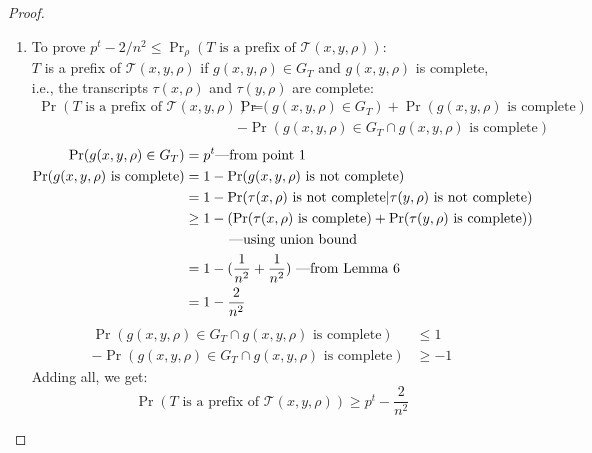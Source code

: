 \documentclass{article}
\begin{document}
\begin{proof}
\begin{enumerate}
        \item To prove $p^t-2/n^2 \leq \Pr_\rho(T\text{ is a prefix of }\mathcal{T}(x,y,\rho))$:\\
    $T$ is a prefix of $\mathcal{T}(x,y,\rho)$ if $g(x,y,\rho)\in G_T$ and $g(x,y,\rho)$
    is complete, i.e., the transcripts $\tau(x,\rho)$ and $\tau(y,\rho)$ are complete:
    \begin{align}
        \Pr(T\text{ is a prefix of }\mathcal{T}(x,y,\rho))=&\Pr(g(x,y,\rho)\in G_T)
    +\Pr(g(x,y,\rho)\text{ is complete}) \nonumber\\
    &-\Pr(g(x,y,\rho)\in G_T \cap g(x,y,\rho)\text{ is complete})\nonumber
    \end{align}
    \begin{align}
        \Pr(g(x,y,\rho)\in G_T)&=p^t\text{---from point 1} \nonumber\\
        \Pr(g(x,y,\rho)\text{ is complete})&=1-\Pr(g(x,y,\rho)\text{ is not complete})\nonumber\\
        &=1-\Pr(\tau(x,\rho)\text{ is not complete}|\tau(y,\rho)\text{ is not complete})\nonumber\\
        &\geq 1-(\Pr(\tau(x,\rho)\text{ is complete})
    +\Pr(\tau(y,\rho)\text{ is complete}))\nonumber\\
    &\text{\hspace{1cm}    ---using union bound}\nonumber\\
        &=1-(\frac{1}{n^2}+\frac{1}{n^2})\text{  ---from Lemma 6}\nonumber\\
        &=1-\frac{2}{n^2}\nonumber     
    \end{align}
    \begin{align}
        \Pr(g(x,y,\rho)\in G_T \cap g(x,y,\rho)\text{ is complete})&\leq 1\nonumber\\
        -\Pr(g(x,y,\rho)\in G_T \cap g(x,y,\rho)\text{ is complete})&\geq -1 \nonumber
    \end{align}
    Adding all, we get:
    $$\Pr(T\text{ is a prefix of }\mathcal{T}(x,y,\rho))\geq p^t-\frac{2}{n^2}$$
    \end{enumerate}
\end{proof}
\end{document}
